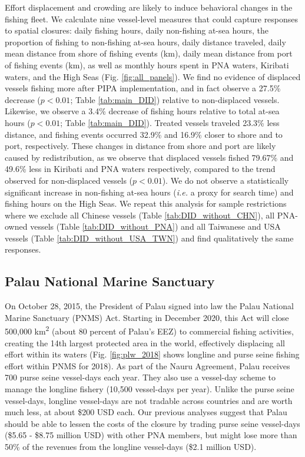 \documentclass[12pt]{article}
\begin{document}
Effort displacement and crowding are likely to induce behavioral changes in the fishing fleet. We calculate nine vessel-level measures that could capture responses to spatial closures: daily fishing hours, daily non-fishing at-sea hours, the proportion of fishing to non-fishing at-sea hours, daily distance traveled, daily mean distance from shore of fishing events (km), daily mean distance from port of fishing events (km), as well as monthly hours spent in PNA waters, Kiribati waters, and the High Seas (Fig. \ref{fig:all_panels}). We find no evidence of displaced vessels fishing more after PIPA implementation, and in fact observe a 27.5\% decrease ($p < 0.01$; Table \ref{tab:main_DID}) relative to non-displaced vessels. Likewise, we observe a 3.4\% decrease of fishing hours relative to total at-sea hours ($p < 0.01$; Table \ref{tab:main_DID}). Treated vessels traveled 23.3\% less distance, and fishing events occurred 32.9\% and 16.9\% closer to shore and to port, respectively. These changes in distance from shore and port are likely caused by redistribution, as we observe that displaced vessels fished 79.67\% and 49.6\% less in Kiribati and PNA waters respectively, compared to the trend observed for non-displaced vessels ($p < 0.01$). We do not observe a statistically significant increase in non-fishing at-sea hours (\emph{i.e.} a proxy for search time) and fishing hours on the High Seas. We repeat this analysis for sample restrictions where we exclude all Chinese vessels (Table \ref{tab:DID_without_CHN}), all PNA-owned vessels (Table \ref{tab:DID_without_PNA}) and all Taiwanese and USA vessels (Table \ref{tab:DID_without_USA_TWN}) and find qualitatively the same responses.

\subsection{Palau National Marine Sanctuary}

On October 28, 2015, the President of Palau signed into law the Palau National Marine Sanctuary (PNMS) Act. Starting in December 2020, this Act will close 500,000 km\textsuperscript{2} (about 80 percent of Palau’s EEZ) to commercial fishing activities, creating the 14th largest protected area in the world, effectively displacing all effort within its waters (Fig. \ref{fig:plw_2018} shows longline and purse seine fishing effort within PNMS for 2018). As part of the Nauru Agreement, Palau receives 700 purse seine vessel-days each year. They also  use a vessel-day scheme to manage the longline fishery  (10,500 vessel-days per year). Unlike the purse seine vessel-days, longline vessel-days are not tradable across countries and are worth much less, at about \$200 USD each. Our previous analyses suggest that Palau should be able to lessen the costs of the closure by trading purse seine vessel-days (\$5.65 - \$8.75 million USD) with other PNA members, but might lose more than 50\% of the revenues from the longline vessel-days (\$2.1 million USD).
\end{document}
